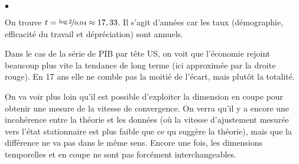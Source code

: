 \documentclass[10pt,notheorems]{beamer}
\theoremstyle{plain}
\theoremstyle{definition} %
\begin{document}
\begin{notes}
\begin{list}{$\bullet$}{}
    
  \item On trouve $t=\nicefrac{\log 2}{0,04} \approx 17,33$. Il s'agit d'années
    car les taux (démographie, efficacité du travail et dépréciation)
    sont annuels.\newline

  \item Dans le cas de la série de PIB par tête US, on voit que l'économie
    rejoint beaucoup plus vite la tendance de long terme (ici approximée par la
    droite rouge). En 17 ans elle ne comble pas la moitié de l'écart, mais
    plutôt la totalité.\newline

  \item On va voir plus loin qu'il est possible d'exploiter la dimension en
    coupe pour obtenir une mesure de la vitesse de convergence. On verra qu'il y
    a encore une incohérence entre la théorie et les données (où la vitesse
    d'ajustement mesurée vers l'état stationnaire est plus faible que ce qu
    suggère la théorie), mais que la différence ne va pas dans le même sens.
    Encore une fois, les dimensions temporelles et en coupe ne sont pas forcément
    interchangeables.

  \end{list}

\end{notes}
\end{document}
